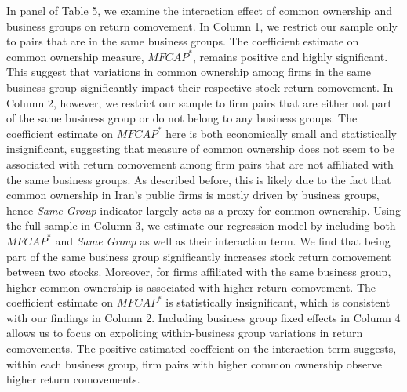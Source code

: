 	
	
	
	In panel  of Table 5, we examine the interaction effect of common ownership and business groups on return comovement. In Column 1, we restrict our sample only to pairs that are in the same business groups. The coefficient estimate on common ownership measure, $\textit{MFCAP}^*$, remains positive and highly significant. This suggest that variations in common ownership among firms in the same business group significantly impact their respective stock return comovement. In Column 2, however, we restrict our sample to firm pairs that are either not part of the same business group or do not belong to any business groups. The coefficient estimate on $\textit{MFCAP}^*$ here is both economically small and statistically insignificant, suggesting that measure of common ownership does not seem to be associated with return comovement among firm pairs that are not affiliated with the same business groups. As described before, this is likely due to the fact that common ownership in Iran's public firms is mostly driven by business groups, hence \textit{Same Group} indicator largely acts as a proxy for common ownership. Using the full sample in Column 3, we estimate our regression model by including both $\textit{MFCAP}^*$ and \textit{Same Group} as well as their interaction term. We find that being part of the same business group significantly increases stock return comovement between two stocks. Moreover, for firms affiliated with the same business group, higher common ownership is associated with higher return comovement. The coefficient estimate on $\textit{MFCAP}^*$ is statistically insignificant, which is consistent with our findings in Column 2. Including business group fixed effects in Column 4 allows us to focus on expoliting within-business group variations in return comovements. The positive estimated coeffcient on the interaction term suggests, within each business group, firm pairs with higher common ownership observe higher return comovements.   
	
	
	
	
	
